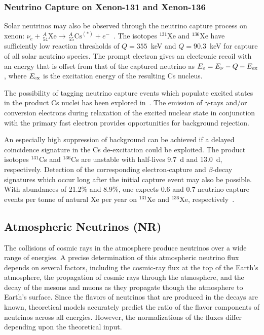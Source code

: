 \subsubsection{Neutrino Capture on Xenon-131 and Xenon-136}

Solar neutrinos may also be observed through the neutrino capture process on xenon: $\nu_e + \,^{A}_{54}\textrm{Xe} \to \,^{A}_{55}\textrm{Cs}^{(*)} + e^{-}$~\cite{Georgadze:1997zv}. The isotopes $^{131}$Xe and $^{136}$Xe have sufficiently low reaction thresholds of $Q=355$~keV and $Q=90.3$~keV for capture of all solar neutrino species. The prompt electron gives an electronic recoil with an energy that is offset from that of the captured neutrino as $E_e = E_\nu-Q-E_{\rm ex}$, where $E_{\rm ex}$ is the excitation energy of the resulting Cs nucleus.

The possibility of tagging neutrino capture events which populate excited states in the product Cs  nuclei has been explored in~\cite{Haselschwardt:2020ffr}. The emission of $\gamma$-rays and/or conversion electrons during relaxation of the excited nuclear state in conjunction with the primary fast electron provides opportunities for background rejection. 

An especially high suppression of background can be achieved if a delayed coincidence signature in the Cs de-excitation could be exploited. The product isotopes $^{131}$Cs and $^{136}$Cs are unstable with half-lives 9.7~d and 13.0~d, respectively. Detection of the corresponding electron-capture and $\beta$-decay signatures which occur long after the initial capture event may also be possible. With abundances of 21.2\% and 8.9\%, one expects 0.6 and 0.7 neutrino capture events per tonne of natural Xe per year on $^{131}$Xe and $^{136}$Xe, respectively~\cite{Haselschwardt:2020ffr}.

\subsection{Atmospheric Neutrinos (NR)}\label{sec:atmnu}

The collisions of cosmic rays in the atmosphere produce neutrinos over a wide range of energies. A precise determination of this atmospheric neutrino flux depends on several factors, including the cosmic-ray flux at the top of the Earth's atmosphere, the propagation of cosmic rays through the atmosphere, and the decay of the mesons and muons as they propagate though the atmosphere to Earth's surface. Since the flavors of neutrinos that are produced in the decays are known, theoretical models accurately predict the ratio of the flavor components of neutrinos across all energies. However, the normalizations of the fluxes differ depending upon the theoretical input. 

